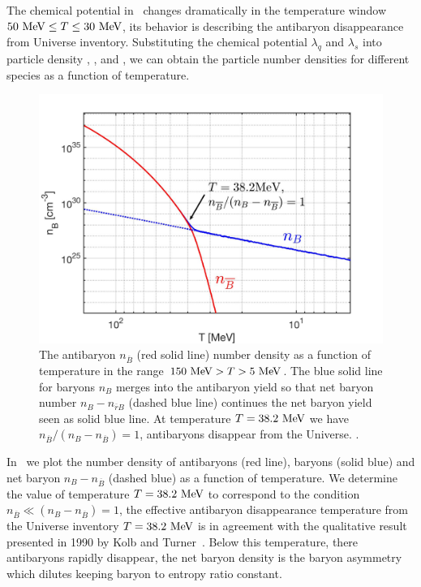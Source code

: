 The chemical potential in~ changes dramatically in the temperature window $50\text{ MeV}\le T\le 30\text{ MeV}$, its behavior is describing the antibaryon disappearance from Universe inventory. Substituting the chemical potential $\lambda_q$ and $\lambda_s$ into particle density , , and , we can obtain the particle number densities for different species as a function of temperature.

\begin{figure} 
\centerline{\includegraphics[width=0.9\linewidth]{./plots/Baryon_Antibaryon_cm.jpg}}
\caption{The antibaryon $n_{\overline  B}$ (red solid line) number density as a function of temperature in the range $150\text{ MeV}>T>5\text{ MeV}$. The blue solid line for baryons  $n_{B}$ merges into the antibaryon yield so that net baryon number $n_{B}-n_{\overline r B}$ (dashed blue line) continues the net  baryon yield seen as solid blue line. At temperature $T=38.2\text{ MeV}$  we have $n_{\overline B}/(n_B-n_{\overline B})=1$, antibaryons disappear from the Universe. . }
\label{Baryon:fig}
\end{figure}

In~ we plot the number density of antibaryons (red line),  baryons (solid blue) and net baryon $n_B-n_{\overline B}$ (dashed blue) as a function of temperature. We determine the value of temperature $T=38.2\text{ MeV}$ to correspond to the condition $n_{\overline B}\ll(n_B-n_{\overline B})=1$, the effective antibaryon  disappearance temperature from the Universe inventory   $T=38.2\text{ MeV}$ is in agreement with the qualitative result presented in 1990 by Kolb and Turner~\cite{Kolb:1990vq}. Below this temperature, there antibaryons rapidly disappear, the net baryon density is the baryon asymmetry which dilutes keeping baryon to entropy ratio constant.

